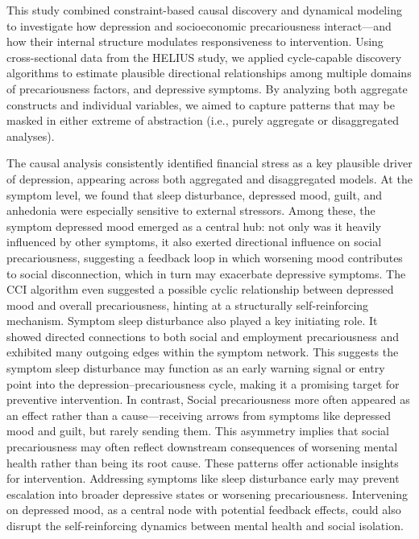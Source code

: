 \documentclass[
]{article}
\begin{document}
This study combined constraint-based causal discovery and dynamical
modeling to investigate how depression and socioeconomic precariousness
interact---and how their internal structure modulates responsiveness to
intervention. Using cross-sectional data from the HELIUS study, we
applied cycle-capable discovery algorithms to estimate plausible
directional relationships among multiple domains of precariousness
factors, and depressive symptoms. By analyzing both aggregate constructs
and individual variables, we aimed to capture patterns that may be
masked in either extreme of abstraction (i.e., purely aggregate or
disaggregated analyses).

The causal analysis consistently identified financial stress as a key
plausible driver of depression, appearing across both aggregated and
disaggregated models. At the symptom level, we found that sleep
disturbance, depressed mood, guilt, and anhedonia were especially
sensitive to external stressors. Among these, the symptom depressed mood
emerged as a central hub: not only was it heavily influenced by other
symptoms, it also exerted directional influence on social
precariousness, suggesting a feedback loop in which worsening mood
contributes to social disconnection, which in turn may exacerbate
depressive symptoms. The CCI algorithm even suggested a possible cyclic
relationship between depressed mood and overall precariousness, hinting
at a structurally self-reinforcing mechanism. Symptom sleep disturbance
also played a key initiating role. It showed directed connections to
both social and employment precariousness and exhibited many outgoing
edges within the symptom network. This suggests the symptom sleep
disturbance may function as an early warning signal or entry point into
the depression--precariousness cycle, making it a promising target for
preventive intervention. In contrast, Social precariousness more often
appeared as an effect rather than a cause---receiving arrows from
symptoms like depressed mood and guilt, but rarely sending them. This
asymmetry implies that social precariousness may often reflect
downstream consequences of worsening mental health rather than being its
root cause. These patterns offer actionable insights for intervention.
Addressing symptoms like sleep disturbance early may prevent escalation
into broader depressive states or worsening precariousness. Intervening
on depressed mood, as a central node with potential feedback effects,
could also disrupt the self-reinforcing dynamics between mental health
and social isolation.
\end{document}
